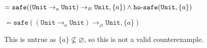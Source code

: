 \documentclass{llncs}
\newcommand{\keywadj}[1]{\mathtt{#1}}
\newcommand{\kwa}[1]{\keywadj{ #1 }}
\newcommand{\hyphen}{\hbox{-}}
\newcommand{\Unit}[0]{ \kwa{Unit} }
\newcommand{\safe}[2]{ \kwa{safe}(#1, #2) }
\newcommand{\hosafe}[2]{ \kwa{ho \hyphen safe}(#1, #2) }
\begin{document}
	$= \safe{(\Unit \rightarrow_{a} \Unit) \rightarrow_{\varnothing} \Unit}{\{ a \}} \land \hosafe{\Unit}{\{ a \}}$
	
	$= \safe{(\Unit \rightarrow_{a} \Unit) \rightarrow_{\varnothing} \Unit}{\{ a \}}$
	
	This is untrue as $\{ a \} \nsubseteq \varnothing$, so this is not a valid counterexample.
	













\end{document}
